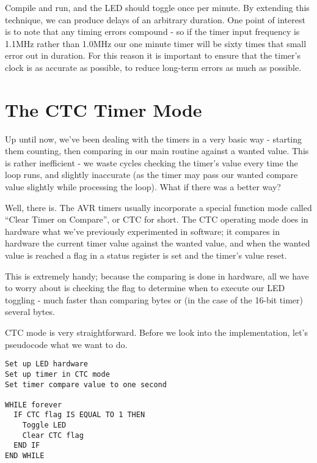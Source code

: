 \documentclass[a4paper,oneside,notitlepage]{book}
\begin{document}
Compile and run, and the LED should toggle once per minute. By extending this technique, we can produce delays of an arbitrary duration. One point of interest is to note that any timing errors compound - so if the timer input frequency is 1.1MHz rather than 1.0MHz our one minute timer will be sixty times that small error out in duration. For this reason it is important to ensure that the timer's clock is as accurate as possible, to reduce long-term errors as much as possible.


\label{chp:CTCMode}
\chapter{The CTC Timer Mode}

Up until now, we've been dealing with the timers in a very basic way - starting them counting, then comparing in our main routine against a wanted value. This is rather inefficient - we waste cycles checking the timer's value every time the loop runs, and slightly inaccurate (as the timer may pass our wanted compare value slightly while processing the loop). What if there was a better way?

Well, there is. The AVR timers usually incorporate a special function mode called ``Clear Timer on Compare'', or CTC for short. The CTC operating mode does in hardware what we've previously experimented in software; it compares in hardware the current timer value against the wanted value, and when the wanted value is reached a flag in a status register is set and the timer's value reset.

This is extremely handy; because the comparing is done in hardware, all we have to worry about is checking the flag to determine when to execute our LED toggling - much faster than comparing bytes or (in the case of the 16-bit timer) several bytes.

CTC mode is very straightforward. Before we look into the implementation, let's pseudocode what we want to do.

\begin{center}
\begin{lstlisting}[keywordstyle=\color{black},commentstyle=\color{black}]
Set up LED hardware
Set up timer in CTC mode
Set timer compare value to one second

WHILE forever
  IF CTC flag IS EQUAL TO 1 THEN
    Toggle LED
    Clear CTC flag
  END IF
END WHILE
\end{lstlisting}
\end{center}
\end{document}
